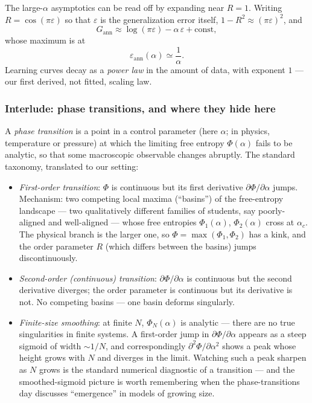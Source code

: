 \documentclass[11pt]{article}
\begin{document}
The large-$\alpha$ asymptotics can be read off by expanding near $R = 1$.
Writing $R = \cos(\pi\varepsilon)$ so that $\varepsilon$ is the
generalization error itself, $1 - R^2 \approx (\pi\varepsilon)^2$, and
\begin{equation}
  \label{eq:Gann-large-alpha}
  G_{\mathrm{ann}} \approx \log(\pi\varepsilon) - \alpha\,\varepsilon
  + \text{const},
\end{equation}
whose maximum is at
\begin{equation}
  \label{eq:annealed-eps}
  \varepsilon_{\mathrm{ann}}(\alpha) \simeq \frac{1}{\alpha}.
\end{equation}
Learning curves decay as a \emph{power law} in the amount of data, with
exponent $1$ --- our first derived, not fitted, scaling law.

\subsubsection{Interlude: phase transitions, and where they hide here}
\label{sec:phase-transitions}

A \emph{phase transition} is a point in a control parameter (here
$\alpha$; in physics, temperature or pressure) at which the limiting free
entropy $\Phi(\alpha)$ fails to be analytic, so that some macroscopic
observable changes abruptly. The standard taxonomy, translated to our
setting:
\begin{itemize}
  \item \emph{First-order transition}: $\Phi$ is continuous but its first
  derivative $\partial\Phi/\partial\alpha$ jumps. Mechanism: two competing
  local maxima (``basins'') of the free-entropy landscape --- two
  qualitatively different families of students, say poorly-aligned and
  well-aligned --- whose free entropies $\Phi_1(\alpha)$, $\Phi_2(\alpha)$
  cross at $\alpha_c$. The physical branch is the larger one, so
  $\Phi = \max(\Phi_1, \Phi_2)$ has a kink, and the order parameter $R$
  (which differs between the basins) jumps discontinuously.
  \item \emph{Second-order (continuous) transition}: $\partial\Phi/
  \partial\alpha$ is continuous but the second derivative diverges; the
  order parameter is continuous but its derivative is not. No competing
  basins --- one basin deforms singularly.
  \item \emph{Finite-size smoothing}: at finite $N$, $\Phi_N(\alpha)$ is
  analytic --- there are no true singularities in finite systems. A
  first-order jump in $\partial\Phi/\partial\alpha$ appears as a steep
  sigmoid of width $\sim 1/N$, and correspondingly $\partial^2\Phi/
  \partial\alpha^2$ shows a peak whose height grows with $N$ and diverges
  in the limit. Watching such a peak sharpen as $N$ grows is the standard
  numerical diagnostic of a transition --- and the smoothed-sigmoid picture
  is worth remembering when the phase-transitions day discusses
  ``emergence'' in models of growing size.
\end{itemize}
\end{document}
